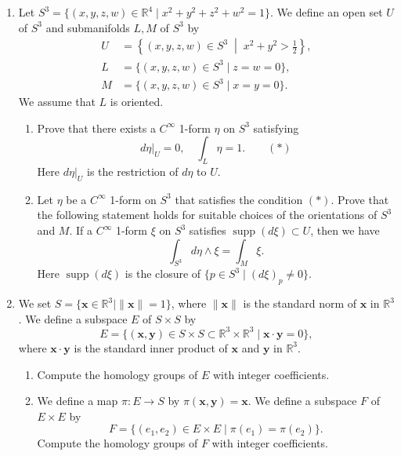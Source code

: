 \documentclass{article}
\begin{document}
\begin{enumerate}[label=\fbox{\arabic*}]
  \item Let $S^3 = \{ (x, y, z, w) \in \mathbb{R}^4 \mid x^2 + y^2 + z^2 + w^2 = 1 \}$. We define an open set $U$ of $S^3$ and submanifolds $L, M$ of $S^3$ by
        \begin{align*}
          U & = \left\{ (x, y, z, w) \in S^3 \;\middle|\; x^2 + y^2 > \frac{1}{2} \right\}, \\
          L & = \{ (x, y, z, w) \in S^3 \mid z = w = 0 \},                                  \\
          M & = \{ (x, y, z, w) \in S^3 \mid x = y = 0 \}.
        \end{align*}
        We assume that $L$ is oriented.
        \begin{enumerate}[label=(\arabic*)]
          \item Prove that there exists a $C^\infty$ 1-form $\eta$ on $S^3$ satisfying
                \[
                  d\eta|_U = 0, \quad \int_L \eta = 1. \qquad (*)
                \]
                Here $d\eta|_U$ is the restriction of $d\eta$ to $U$.
          \item Let $\eta$ be a $C^\infty$ 1-form on $S^3$ that satisfies the condition $(*)$. Prove that the following statement holds for suitable choices of the orientations of $S^3$ and $M$.
                If a $C^\infty$ 1-form $\xi$ on $S^3$ satisfies $\operatorname{supp}(d\xi) \subset U$, then we have
                \[
                  \int_{S^3} d\eta \wedge \xi = \int_M \xi.
                \]
                Here $\operatorname{supp}(d\xi)$ is the closure of $\{ p \in S^3 \mid (d\xi)_p \neq 0 \}$.
        \end{enumerate}

  \item We set $S = \{ \boldsymbol{x} \in \mathbb{R}^3 \mid \|\boldsymbol{x}\| = 1 \}$, where $\|\boldsymbol{x}\|$ is the standard norm of $\boldsymbol{x}$ in $\mathbb{R}^3$. We define a subspace $E$ of $S \times S$ by
        \[
          E = \{ (\boldsymbol{x}, \boldsymbol{y}) \in S \times S \subset \mathbb{R}^3 \times \mathbb{R}^3 \mid \boldsymbol{x} \cdot \boldsymbol{y} = 0 \},
        \]
        where $\boldsymbol{x} \cdot \boldsymbol{y}$ is the standard inner product of $\boldsymbol{x}$ and $\boldsymbol{y}$ in $\mathbb{R}^3$.
        \begin{enumerate}[label=(\arabic*)]
          \item Compute the homology groups of $E$ with integer coefficients.
          \item We define a map $\pi: E \to S$ by $\pi(\boldsymbol{x}, \boldsymbol{y}) = \boldsymbol{x}$. We define a subspace $F$ of $E \times E$ by
                \[
                  F = \{ (e_1, e_2) \in E \times E \mid \pi(e_1) = \pi(e_2) \}.
                \]
                Compute the homology groups of $F$ with integer coefficients.
        \end{enumerate}


\end{enumerate}
\end{document}
